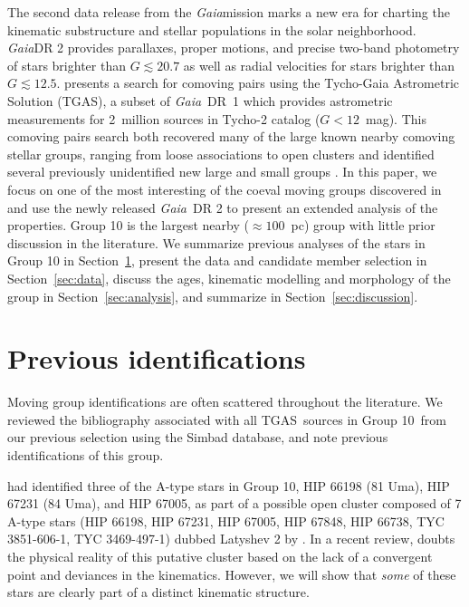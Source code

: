 \documentclass[modern,letterpaper]{aastex61}
\newcommand{\project}[1]{\textsl{#1}}
\newcommand{\acronym}[1]{{\small{#1}}}
\newcommand{\gaia}{\project{Gaia}}
\newcommand{\sectionname}{Section}
\newcommand{\tgas}{\acronym{TGAS}}
\newcommand{\groupTen}{Group 10}
\begin{document}
The second data release from the \gaia mission \citep[][DR 2]{2018arXiv180409365G} marks a new era for charting the kinematic substructure and stellar populations in the solar neighborhood.
\gaia DR 2 provides parallaxes, proper motions, and precise two-band photometry of stars brighter than $G\lesssim 20.7$ as well as radial velocities for stars brighter than $G\lesssim12.5$.
\citet{2017AJ....153..257O} presents a search for comoving pairs using the
Tycho-Gaia Astrometric Solution (\tgas), a subset of \gaia\ DR~1 which provides
astrometric measurements for 2~million sources in Tycho-2 catalog ($G<12$~mag).
This comoving pairs search both recovered many of the large known nearby
comoving stellar groups, ranging from loose associations to open clusters and
identified several previously unidentified new large and small groups
\citep[see also][]{2018arXiv180409058F}.
In this paper, we focus on one of the most interesting of the coeval moving
groups discovered in \citet{2017AJ....153..257O} and use the newly released \gaia\
DR 2 to present an extended analysis of the properties.
Group 10 is the largest nearby ($\approx 100$~pc) group with little prior
discussion in the literature.
We summarize previous analyses of the stars in Group 10 in \sectionname~\ref{sec:history},
present the data and candidate member selection in \sectionname~\ref{sec:data},
discuss the ages, kinematic modelling and morphology of the group in \sectionname~\ref{sec:analysis},
and summarize in \sectionname~\ref{sec:discussion}.

\section{Previous identifications}
\label{sec:history}

Moving group identifications are often scattered throughout the literature. We
reviewed the bibliography associated with all \tgas\ sources in
\groupTen\ from our previous selection \citep{2017AJ....153..257O} using the
Simbad database, and note previous identifications of this group.

\citet{1977ATsir.969....7L} had identified three of the A-type stars in \groupTen,
HIP 66198 (81 Uma), HIP 67231 (84 Uma), and HIP 67005, as part of
a possible open cluster composed of 7 A-type stars
(HIP 66198,
HIP 67231,
HIP 67005,
HIP 67848,
HIP 66738,
TYC 3851-606-1,
TYC 3469-497-1)
dubbed Latyshev 2 by \citet{2003stcl.book.....A}.
In a recent review, \citet{2016IAUS..314...21M} doubts the physical reality of
this putative cluster based on the lack of a convergent point and deviances in
the kinematics.
However, we will show that \emph{some} of these stars are clearly part of a distinct
kinematic structure.
\end{document}
